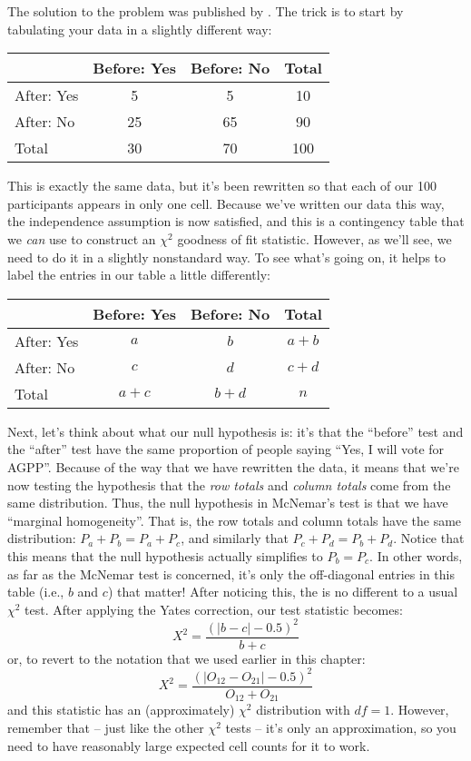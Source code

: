The solution to the problem was published by . The trick is to start by tabulating your data in a slightly different way:
\begin{center}
\begin{tabular}{l|cc|c}
& Before: Yes & Before: No & Total \\ \hline
After: Yes   & 5 & 5 & 10 \\
After: No    & 25 & 65 & 90 \\ \hline
Total        & 30 & 70 & 100
\end{tabular}
\end{center}
\noindent
This is exactly the same data, but it's been rewritten so that each of our 100 participants appears in only one cell. Because we've written our data this way, the independence assumption is now satisfied, and this is a contingency table that we {\it can} use to construct an $\chi^2$ goodness of fit statistic. However, as we'll see, we need to do it in a slightly nonstandard way. To see what's going on, it helps to label the entries in our table a little differently:
\begin{center}
\begin{tabular}{l|cc|c}
& Before: Yes & Before: No & Total \\ \hline
After: Yes   & $a$ & $b$ & $a+b$ \\
After: No & $c$ & $d$ & $c+d$ \\ \hline
Total & $a+c$ & $b+d$ & $n$
\end{tabular}
\end{center}
\noindent
Next, let's think about what our null hypothesis is: it's that the ``before'' test and the ``after'' test have the same proportion of people saying ``Yes, I will vote for AGPP''. Because of the way that we have rewritten the data, it means that we're now testing the hypothesis that the {\it row totals} and {\it column totals} come from the same distribution. Thus, the null hypothesis in McNemar's test is that we have ``marginal homogeneity''. That is, the row totals and column totals have the same distribution: $P_a + P_b = P_a + P_c$, and similarly that $P_c + P_d = P_b + P_d$. Notice that this means that the null hypothesis actually simplifies to $P_b = P_c$. In other words, as far as the McNemar test is concerned, it's only the off-diagonal entries in this table (i.e., $b$ and $c$) that matter! After noticing this, the  is no different to a usual $\chi^2$ test. After applying the Yates correction, our test statistic becomes:
$$
X^2 = \frac{(|b-c| - 0.5)^2}{b+c}
$$
or, to revert to the notation that we used earlier in this chapter:
$$
X^2 = \frac{(|O_{12}-O_{21}| - 0.5)^2}{O_{12} + O_{21}}
$$
and this statistic has an (approximately) $\chi^2$ distribution with $df=1$. However, remember that -- just like the other $\chi^2$ tests -- it's only an approximation, so you need to have reasonably large expected cell counts for it to work.


